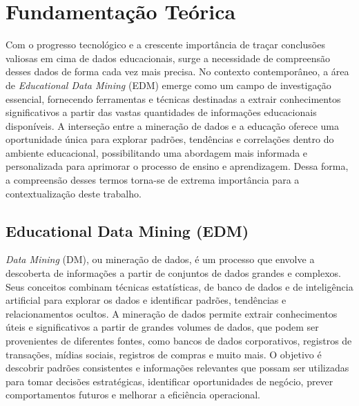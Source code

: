 \chapter{Fundamentação Teórica} 



Com o progresso tecnológico e a crescente importância de traçar conclusões valiosas em cima de dados educacionais, surge a necessidade de compreensão desses dados de forma cada vez mais precisa. No contexto contemporâneo, a área de \textit{Educational Data Mining} (EDM) emerge como um campo de investigação essencial, fornecendo ferramentas e técnicas destinadas a extrair conhecimentos significativos a partir das vastas quantidades de informações educacionais disponíveis. A interseção entre a mineração de dados e a educação oferece uma oportunidade única para explorar padrões, tendências e correlações dentro do ambiente educacional, possibilitando uma abordagem mais informada e personalizada para aprimorar o processo de ensino e aprendizagem. Dessa forma, a compreensão desses termos torna-se de extrema importância para a contextualização deste trabalho.






  
\section{Educational Data Mining (EDM)}

\textit{Data Mining} (DM), ou mineração de dados, é um processo que envolve a descoberta de informações a partir de conjuntos de dados grandes e complexos. Seus conceitos combinam técnicas estatísticas, de banco de dados e de inteligência artificial para explorar os dados e identificar padrões, tendências e relacionamentos ocultos. A mineração de dados permite extrair conhecimentos úteis e significativos a partir de grandes volumes de dados, que podem ser provenientes de diferentes fontes, como bancos de dados corporativos, registros de transações, mídias sociais, registros de compras e muito mais. O objetivo é descobrir padrões consistentes e informações relevantes que possam ser utilizadas para tomar decisões estratégicas, identificar oportunidades de negócio, prever comportamentos futuros e melhorar a eficiência operacional.

